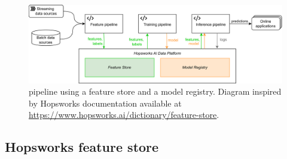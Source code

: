 \begin{figure}[!ht]
    \begin{center}
      \includegraphics[width=\textwidth]{figures/2-background_and_related_work/MLOps_hops.png}
    \end{center}
    \caption[Feature store in an MLOps pipeline]{ pipeline using a feature store and a model registry. Diagram inspired by Hopsworks documentation available at \url{https://www.hopsworks.ai/dictionary/feature-store}.}
    \label{fig:mlops_hops}
\end{figure}


\subsection{Hopsworks feature store}
\label{subsec:back_hopsworks_FS}
